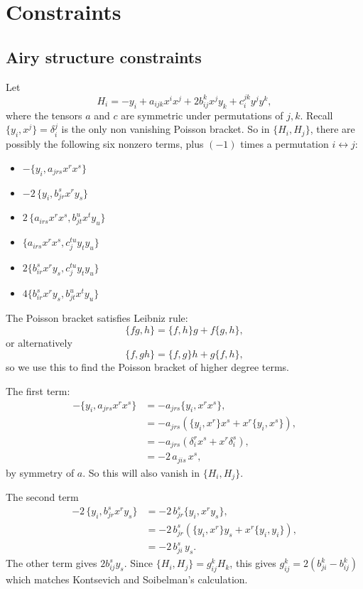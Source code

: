 \chapter{Constraints}
\section{Airy structure constraints}
\label{appendix:airy}
    Let
    \[ H_i = -y_i + a_{ijk} x^i x^j + 2 b_{ij}^k x^j y_k + c_i^{jk} y^j y^k, \]
    where the tensors \( a\) and \(c\) are symmetric under permutations of \(j,k\). Recall \( \{ y_i , x^j \} = \delta_i^j \) is the only non vanishing Poisson bracket. So in \( \{ H_i, H_j \} \), there are possibly the following six nonzero terms, plus \((-1)\) times a permutation \( i \leftrightarrow j \):
    \begin{itemize}
        \item \( -\{  y_i, a_{jrs} x^r x^s \}\) 
        \item \( -2\,\{  y_i , b_{jr}^s x^r y_s \} \)
        \item \( 2 \, \{ a_{irs} x^r x^s, b_{jt}^{u} x^t y_u \} \)
        \item \(  \{ a_{irs} x^r x^s, c_{j}^{t u} y_t y_u \} \)
        \item \(2 \{ b_{ir}^s x^r y_s , c_{j}^{t u} y_t y_u \} \)
        \item \(4 \{ b_{ir}^s x^r y_s ,b_{jt}^u x^t y_u\} \)
    \end{itemize}

    The Poisson bracket satisfies Leibniz rule: 
    \[ \{ f g  , h \}  = \{ f, h \} g + f \{g,h\}, \] 
    or alternatively  
    \[ \{ f , g h \} = \{ f,g\} h + g \{ f , h\}, \]
    so we use this to find the Poisson bracket of higher degree terms.
    
    The first term:
    \begin{align*}
      -\{  y_i, a_{jrs} x^r x^s \}   & = -a_{jrs} \{ y_i, x^r x^s  \} ,\\
                                     &= -a_{jrs} \left( \{ y_i, x^r\} x^s + x^r \{ y_i, x^s \} \right) ,\\ 
                                     &= - a_{jrs} \left( \delta_i^r x^s + x^r \delta^s_i \right) ,\\
                                     &= - 2 \, a_{jis} \, x^s,
    \end{align*}
    by symmetry of \(a\). So this will also vanish in \( \{ H_i, H_j \} \).
    
    The second term
    \begin{align*}
        -2\,\{  y_i , b_{jr}^s x^r y_s \} &= -2 \, b_{jr}^s \{y_i, x^r y_s\}, \\
                                          &= -2 \, b_{jr}^s \left( \{y_i, x^r\}  y_s + x^r \{ y_i ,y_i\} \right), \\
                                          & = -2 \, b_{ji}^s \, y_s.
    \end{align*}
    The other term gives \(  2 b_{ij}^s y_s \).  Since \( \{ H_i , H_j \} = g_{ij}^k H_k \), this gives
    \( g_{ij}^k = 2 \left( b_{ji}^k - b_{i j}^k\right) \) which matches Kontsevich and Soibelman's calculation. 
    

